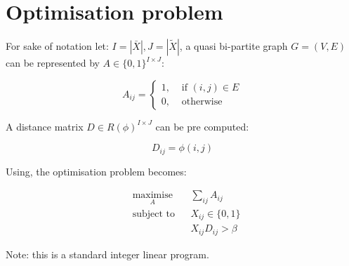 \documentclass{article}
\theoremstyle{definition} \newtheorem{definition}{Definition}
\begin{document}
\section{Optimisation problem}\label{sec:optimisation-problem}

For sake of notation let: \(I=|\bar X|, J=|\tilde X|\), a quasi bi-partite graph
\(G=(V, E)\) can be represented by \(A\in \{0, 1\}^{I\times J}\):

\[
    A_{ij}
    =
    \begin{cases}
        1,&\text{ if }(i, j)\in E\\
        0,&\text{ otherwise}
    \end{cases}
\]

A distance matrix \(D\in R(\phi)^{I\times J}\) can be pre computed:

\[
    D_{ij}
    =
    \phi(i, j)
\]

Using, the optimisation problem becomes:

\begin{equation*}
	\begin{aligned}
		& \underset{A}{\text{maximise}}
        &                               & \sum_{ij}A_{ij} \\
        & \text{subject to}
        &                               & X_{ij} \in \{0, 1\} \\
        &
        &                               & X_{ij}D_{ij} > \beta
	\end{aligned}
\end{equation*}

Note: this is a standard integer linear program.

\end{document}
